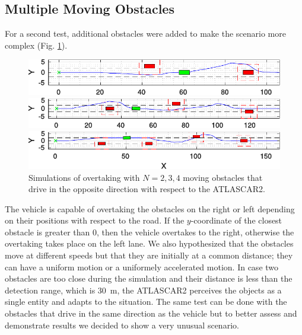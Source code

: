 \subsection{Multiple Moving Obstacles}
For a second test, additional obstacles were added to make the scenario more complex (Fig. \ref{fig:obstacleAvoidance_random}).
\begin{figure}[!h]
	\centering
	\begin{minipage}[t]{\textwidth}
		\includegraphics[width=\textwidth]{./figure/random_N_obstacles/overtaking_random_2.pdf}
	\end{minipage}
	\begin{minipage}[t]{\textwidth}
		\includegraphics[width=\textwidth]{./figure/random_N_obstacles/overtaking_random.pdf}
	\end{minipage}
	\begin{minipage}[t]{\textwidth}
		\includegraphics[width=\textwidth]{./figure/random_N_obstacles/overtaking_random_1.pdf}
	\end{minipage}
	\caption{Simulations of overtaking with $N = 2,3,4$ moving obstacles that drive in the opposite direction with respect to the ATLASCAR2.}
	\label{fig:obstacleAvoidance_random}
\end{figure}

The vehicle is capable of overtaking the obstacles on the right or left depending on their positions with respect to the road. If the $y$-coordinate of the closest obstacle is greater than 0, then the vehicle overtakes to the right, otherwise the overtaking takes place on the left lane. We also hypothesized that the obstacles move at different speeds but that they are initially at a common distance; they can have a uniform motion or a uniformely accelerated motion. In case two obstacles are too close during the simulation and their distance is less than the detection range, which is \SI{30}{m}, the ATLASCAR2 perceives the objects as a single entity and adapts to the situation. The same test can be done with the obstacles that drive in the same direction as the vehicle but to better assess and demonstrate results we decided to show a very unusual scenario.

